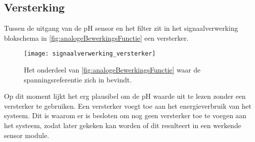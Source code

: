 \subsection{Versterking}\label{sec:versterking}
Tussen de uitgang van de pH sensor en het filter zit in het signaalverwerking blokschema in \cref{fig:analogeBewerkingsFunctie} een versterker.

\begin{figure}[!htbp]
    \centering
    \texttt{[image: signaalverwerking\_versterker]}
    \caption{Het onderdeel van \cref{fig:analogeBewerkingsFunctie} waar de spanningsreferentie zich in bevindt.}
    \label{fig:versterkerInSchema}
\end{figure}

Op dit moment lijkt het erg plausibel om de pH waarde uit te lezen zonder een versterker te gebruiken. Een versterker voegt toe aan het energieverbruik van het systeem. Dit is waarom er is besloten om nog geen versterker toe te voegen aan het systeem, zodat later gekeken kan worden of dit resulteert in een werkende sensor module.